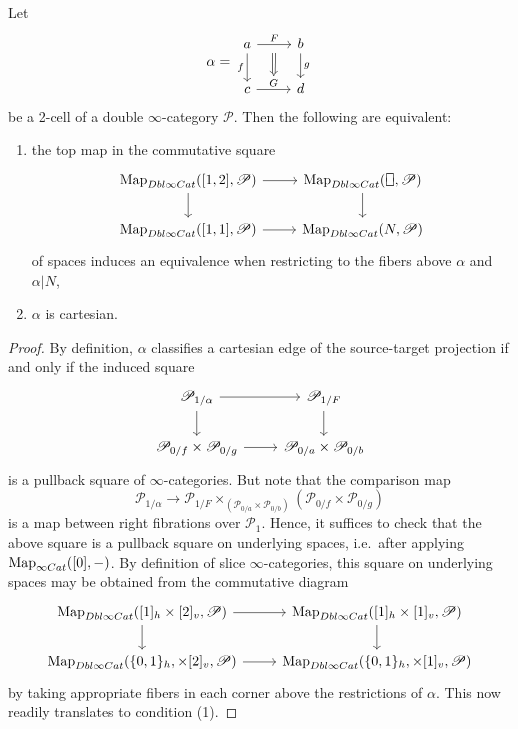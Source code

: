 \documentclass[a4paper, 11pt]{amsart}
\numberwithin{theorem}{section}
\theoremstyle{definition}
\newcommand{\cat}[1]{\textup{#1}}
\newcommand{\map}{\mathrm{Map}}
\newcommand{\Cat}{\cat{Cat}}
\renewcommand{\P}{\mathscr{P}}
\newcommand{\DbliCat}{\cat{Dbl}\infty\cat{Cat}}
\newcommand*{\vrectangle}{{\ooalign{\lower.3ex\hbox{$\sqcup$}\cr\raise.4ex\hbox{$\sqcap$}}}}
\begin{document}
\begin{lemma}\label{lem.cart-niche-fillers}
	Let \[
	\alpha  = \begin{tikzcd} 
		a \arrow[r,"F"name=f]\arrow[d,"f"'] & b \arrow[d, "g"] \\ 
		c \arrow[r, "G"name=t] & d
		\arrow[from=f,to=t, Rightarrow, shorten <= 6pt]
	\end{tikzcd}
	\] be a 2-cell of a double $\infty$-category $\P$. Then the following are equivalent: 
	\begin{enumerate}[noitemsep]
		\item the top map in the commutative square
		\[
		\begin{tikzcd}
			\map_{\DbliCat}([1,2], \P) \arrow[r]\arrow[d] & \map_{\DbliCat}(\vrectangle, \P) \arrow[d] \\
			\map_{\DbliCat}([1,1], \P) \arrow[r] & \map_{\DbliCat}(N, \P)
		\end{tikzcd}
		\]
		of spaces
		induces an equivalence when restricting to the fibers above $\alpha$ and $\alpha|N$,
		\item $\alpha$ is cartesian.
	\end{enumerate}
\end{lemma}
\begin{proof}
	By definition, $\alpha$ classifies a cartesian edge of the source-target projection if and only if the induced square 
	\[
		\begin{tikzcd}
			\P_{1/\alpha} \arrow[r]\arrow[d] & \P_{1/F} \arrow[d] \\
			\P_{0/f} \times \P_{0/g} \arrow[r] & \P_{0/a} \times \P_{0/b} 
		\end{tikzcd}
	\]
	is a pullback square of $\infty$-categories. But note that the comparison map 
	$$
	\P_{1/\alpha}\rightarrow \P_{1/F} \times_{(\P_{0/a} \times \P_{0/b} )} (\P_{0/f} \times \P_{0/g} )
	$$
	is a map between right fibrations over $\P_1$. Hence, it suffices to check that the above square is a pullback square on 
	underlying spaces, i.e.\ after applying $\map_{\infty\Cat}([0], -)$. 
	By definition of slice $\infty$-categories, this square on underlying spaces may be obtained from the commutative diagram
	\[
		\begin{tikzcd}
			\map_{\DbliCat}([1]_h \times [2]_v, \P) \arrow[r]\arrow[d] &\map_{\DbliCat}([1]_h \times [1]_v, \P)  \arrow[d] \\
			\map_{\DbliCat}(\{0,1\}_h, \times [2]_v, \P) \arrow[r] & \map_{\DbliCat}(\{0,1\}_h, \times [1]_v, \P)
		\end{tikzcd}
	\]
	by taking appropriate fibers in each corner above the restrictions of $\alpha$. This now readily translates to condition (1).
\end{proof}
\end{document}
